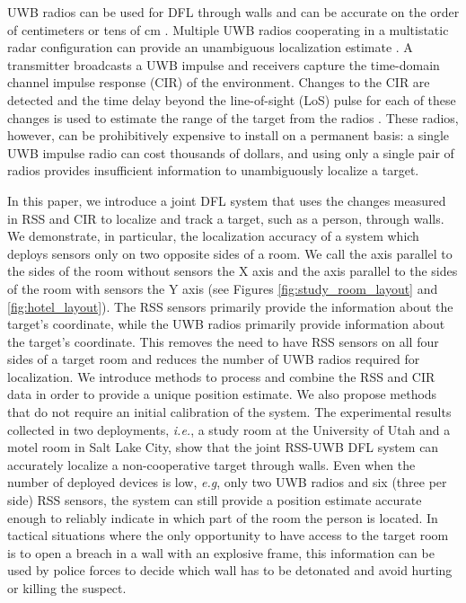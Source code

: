 \documentclass[conference]{IEEEtran}
\begin{document}
UWB radios can be used for DFL through walls and can be accurate on
the order of centimeters or tens of cm \cite{Thoma, Bartoletti}.
Multiple UWB radios cooperating in a multistatic radar configuration
can provide an unambiguous localization estimate \cite{Thoma}.  A
transmitter broadcasts a UWB impulse and receivers capture the
time-domain channel impulse response (CIR) of the environment. Changes
to the CIR are detected and the time delay beyond the line-of-sight
(LoS) pulse for each of these changes is used to estimate the range of
the target from the radios \cite{mccracken2012hidden}. These radios,
however, can be prohibitively expensive to install on a permanent
basis: a single UWB impulse radio can cost thousands of dollars, and
using only a single pair of radios provides insufficient information
to unambiguously localize a target.

In this paper, we introduce a joint DFL system that uses the changes
measured in RSS and CIR to localize and track a target, such as a
person, through walls. We demonstrate, in particular, the localization
accuracy of a system which deploys sensors only on two opposite sides
of a room. We call the axis parallel to the sides of the room without
sensors the X axis and the axis parallel to the sides of the room with
sensors the Y axis (see Figures \ref{fig:study_room_layout} and
\ref{fig:hotel_layout}). The RSS sensors primarily provide the
information about the target's  coordinate, while the UWB radios
primarily provide information about the target's  coordinate. This
removes the need to have RSS sensors on all four sides of a target
room and reduces the number of UWB radios required for
localization. We introduce methods to process and combine the RSS and
CIR data in order to provide a unique position estimate. We also
propose methods that do not require an initial calibration of the
system. The experimental results collected in two deployments,
\emph{i.e.}, a study room at the University of Utah and a motel room
in Salt Lake City, show that the joint RSS-UWB DFL system can
accurately localize a non-cooperative target through walls. Even when
the number of deployed devices is low, \emph{e.g}, only two UWB radios
and six (three per side) RSS sensors, the system can still provide a
position estimate accurate enough to reliably indicate in which part
of the room the person is located. In tactical situations where the
only opportunity to have access to the target room is to open a breach
in a wall with an explosive frame, this information can be used by
police forces to decide which wall has to be detonated and avoid
hurting or killing the suspect.
\end{document}
